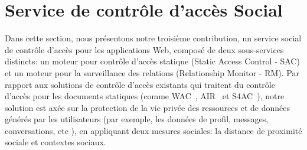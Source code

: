 \section*{Service de contrôle d'accès Social}
Dans cette section, nous présentons notre troisième contribution, un service social de contrôle d'accès pour les applications Web, composé de deux sous-services distincts: un moteur pour contrôle d'accès statique (Static Access Control - SAC) et un moteur pour la surveillance des relations (Relationship Monitor - RM). Par rapport aux solutions de contrôle d'accès existants qui traitent du contrôle d'accès pour les documents statiques (comme WAC~\cite{hollenbach2009using}, AIR~\cite{kagal2011gasping} et S4AC~\cite{villata2011social}), notre solution est axée sur la protection de la vie privée des ressources et de données générés par les utilisateurs (par exemple, les données de profil, messages, conversations, etc ), en appliquant deux mesures sociales: la distance de proximité sociale et contextes sociaux.\\


